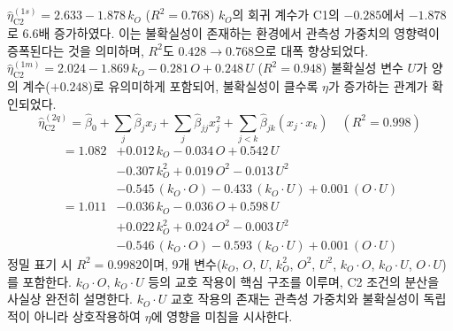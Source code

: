 \subsection{}
\label{subsec:reg_c2}

$\hat{\eta}_{\text{C2}}^{(1s)} = 2.633 - 1.878\,k_O$ ($R^2 = 0.768$)
$k_O$의 회귀 계수가 C1의 $-0.285$에서 $-1.878$로 $6.6$배 증가하였다.
이는 불확실성이 존재하는 환경에서 관측성 가중치의 영향력이
증폭된다는 것을 의미하며, $R^2$도 $0.428 \to 0.768$으로
대폭 향상되었다.
 $\hat{\eta}_{\text{C2}}^{(1m)} = 2.024 - 1.869\,k_O - 0.281\,O + 0.248\,U$ ($R^2 = 0.948$)
불확실성 변수 $U$가 양의 계수($+0.248$)로 유의미하게 포함되어,
불확실성이 클수록 $\eta$가 증가하는 관계가 확인되었다.
\begin{equation}
  \hat{\eta}_{\text{C2}}^{(2q)} = \hat{\beta}_0
    + \sum_{j} \hat{\beta}_j x_j
    + \sum_{j} \hat{\beta}_{jj} x_j^2
    + \sum_{j<k} \hat{\beta}_{jk} (x_j \cdot x_k)
  \quad (R^2 = 0.998)
\end{equation}
\ifdefined\ERRATAFIX
\begin{equation}
  \begin{aligned}
    = 1.082
    &+ 0.012\,k_O - 0.034\,O + 0.542\,U \\
    &- 0.307\,k_O^2 + 0.019\,O^2 - 0.013\,U^2 \\
    &- 0.545\,(k_O \cdot O) - 0.433\,(k_O \cdot U) + 0.001\,(O \cdot U)
  \end{aligned}
\end{equation}
\else
\begin{equation}
  \begin{aligned}
    = 1.011
    &- 0.036\,k_O - 0.036\,O + 0.598\,U \\
    &+ 0.022\,k_O^2 + 0.024\,O^2 - 0.003\,U^2 \\
    &- 0.546\,(k_O \cdot O) - 0.593\,(k_O \cdot U) + 0.001\,(O \cdot U)
  \end{aligned}
\end{equation}
\fi
정밀 표기 시 $R^2 = 0.9982$이며,
9개 변수($k_O$, $O$, $U$, $k_O^2$, $O^2$, $U^2$,
$k_O \cdot O$, $k_O \cdot U$, $O \cdot U$)를 포함한다.
$k_O \cdot O$, $k_O \cdot U$ 등의 교호 작용이 핵심 구조를
이루며, C2 조건의 분산을 사실상 완전히 설명한다.
$k_O \cdot U$ 교호 작용의 존재는 관측성 가중치와 불확실성이
독립적이 아니라 상호작용하여 $\eta$에 영향을 미침을 시사한다.



